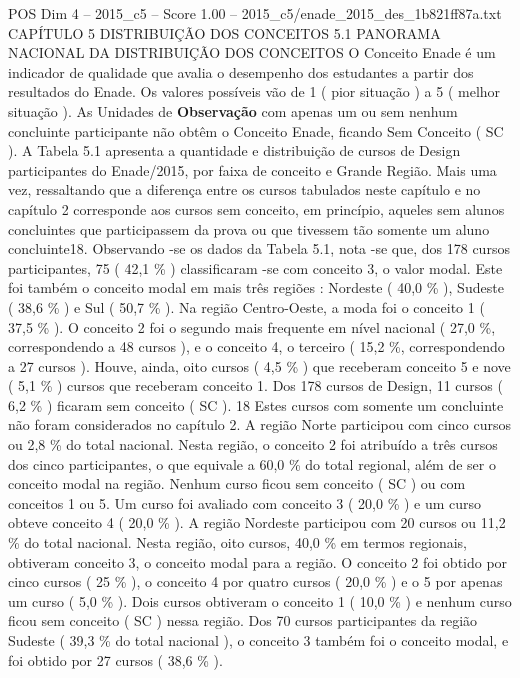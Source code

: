 \begin{textsample}{POS Dim 4 – 2015\_c5 – Score 1.00 – 2015\_c5/enade\_2015\_des\_1b821ff87a.txt}  \label{ex:f4_pos_163}
CAPÍTULO 5 DISTRIBUIÇÃO DOS CONCEITOS 5.1 PANORAMA NACIONAL DA DISTRIBUIÇÃO DOS CONCEITOS O Conceito Enade é um indicador de qualidade que avalia o desempenho dos estudantes a partir dos resultados do Enade.
Os valores possíveis vão de 1 ( pior situação ) a 5 ( melhor situação ).
As Unidades de \textbf{Observação} com apenas um ou sem nenhum concluinte participante não obtêm o Conceito Enade, ficando Sem Conceito ( SC ).
A Tabela 5.1 apresenta a quantidade e distribuição de cursos de Design participantes do Enade/2015, por faixa de conceito e Grande Região.
Mais uma vez, ressaltando que a diferença entre os cursos tabulados neste capítulo e no capítulo 2 corresponde aos cursos sem conceito, em princípio, aqueles sem alunos concluintes que participassem da prova ou que tivessem tão somente um aluno concluinte18.
Observando -se os dados da Tabela 5.1, nota -se que, dos 178 cursos participantes, 75 ( 42,1 \% ) classificaram -se com conceito 3, o valor modal.
Este foi também o conceito modal em mais três regiões : Nordeste ( 40,0 \% ), Sudeste ( 38,6 \% ) e Sul ( 50,7 \% ).
Na região Centro-Oeste, a moda foi o conceito 1 ( 37,5 \% ).
O conceito 2 foi o segundo mais frequente em nível nacional ( 27,0 \%, correspondendo a 48 cursos ), e o conceito 4, o terceiro ( 15,2 \%, correspondendo a 27 cursos ).
Houve, ainda, oito cursos ( 4,5 \% ) que receberam conceito 5 e nove ( 5,1 \% ) cursos que receberam conceito 1.
Dos 178 cursos de Design, 11 cursos ( 6,2 \% ) ficaram sem conceito ( SC ). 18 Estes cursos com somente um concluinte não foram considerados no capítulo 2.
A região Norte participou com cinco cursos ou 2,8 \% do total nacional.
Nesta região, o conceito 2 foi atribuído a três cursos dos cinco participantes, o que equivale a 60,0 \% do total regional, além de ser o conceito modal na região.
Nenhum curso ficou sem conceito ( SC ) ou com conceitos 1 ou 5.
Um curso foi avaliado com conceito 3 ( 20,0 \% ) e um curso obteve conceito 4 ( 20,0 \% ).
A região Nordeste participou com 20 cursos ou 11,2 \% do total nacional.
Nesta região, oito cursos, 40,0 \% em termos regionais, obtiveram conceito 3, o conceito modal para a região.
O conceito 2 foi obtido por cinco cursos ( 25 \% ), o conceito 4 por quatro cursos ( 20,0 \% ) e o 5 por apenas um curso ( 5,0 \% ).
Dois cursos obtiveram o conceito 1 ( 10,0 \% ) e nenhum curso ficou sem conceito ( SC ) nessa região.
Dos 70 cursos participantes da região Sudeste ( 39,3 \% do total nacional ), o conceito 3 também foi o conceito modal, e foi obtido por 27 cursos ( 38,6 \% ).

\end{textsample}
